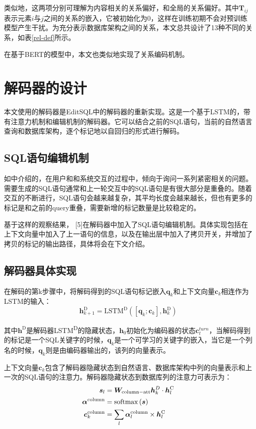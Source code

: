 类似地，这两项分别可理解为内容相关的关系偏好，和全局的关系偏好。其中$\bm{T}_{ij}$表示元素$i$与$j$之间的关系的嵌入，它被初始化为0，这样在训练初期不会对预训练模型产生干扰。为充分表示数据库架构之间的关系，本文总共设计了13种不同的关系，如表\ref{rel-def}所示。

在基于BERT的模型中，本文也类似地实现了关系编码机制。

\section{解码器的设计}

本文使用的解码器是EditSQL\cite{edit19}中的解码器的重新实现。这是一个基于LSTM的，带有注意力机制和编辑机制的解码器。它可以结合之前的SQL语句，当前的自然语言查询和数据库架构，逐个标记地以自回归的形式进行解码。

\subsection{SQL语句编辑机制}

如\citet{edit19}中介绍的，在用户和和系统交互的过程中，倾向于询问一系列紧密相关的问题。需要生成的SQL语句通常和上一轮交互中的SQL语句是有很大部分是重叠的。随着交互的不断进行，SQL语句会越来越复杂，其平均长度会越来越长，但也有更多的标记是和之前的query重叠，需要新增的标记数量是比较稳定的。

基于这样的观察结果， [5]在解码器中加入了SQL语句编辑机制。具体实现包括在上下文向量中加入了上一语句的信息，以及在输出层中加入了拷贝开关，并增加了拷贝的标记的输出路径，具体将会在下文介绍。

\subsection{解码器具体实现}

在解码的第k步骤中，将解码得到的SQL语句标记嵌入$\bm{q}_k$和上下文向量$\bm{c}_k$相连作为LSTM的输入：
\begin{equation}
    \bm{h}_{k+1}^\mathrm{D}=\mathrm{LSTM^D}\left(\left[\bm{q}_k;\bm{c}_k\right],\bm{h}_k^\mathrm{D}\right)
\end{equation}

其中$\bm{h}^\mathrm{D}$是解码器LSTM\textsuperscript{D}的隐藏状态，$\bm{h}_0$初始化为编码器的状态$\bm{c}_t^{turn}$，当解码得到的标记是一个SQL关键字的时候，$\bm{q}_k$是一个可学习的关键字的嵌入，当它是一个列名的时候，$\bm{q}_k$则是由编码器输出的，该列的向量表示。

上下文向量$\bm{c}_k$包含了解码器隐藏状态到自然语言、数据库架构中列的向量表示和上一次的SQL语句的注意力。解码器隐藏状态到数据库列的注意力可表示为：
\begin{align}
    \bm{s}_l&=\bm{W}_\mathrm{column-att}\bm{h}_k^D\cdot\bm{h}_l^\mathrm{C}\\
    \bm{\alpha}^\mathrm{column}&=\mathrm{softmax}\left(\bm{s}\right)\\
    \bm{c}_k^\mathrm{column}&=\sum_{l}{\bm{\alpha}_l^\mathrm{column}\times\bm{h}_l^\mathrm{C}}
\end{align}

